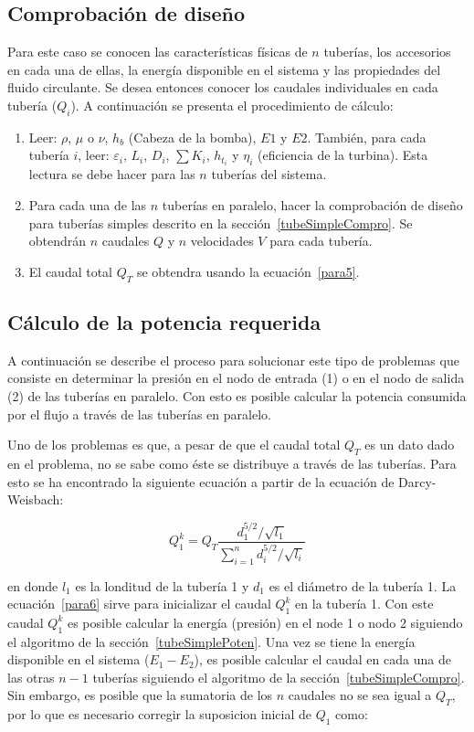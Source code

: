 \documentclass[10pt, oneside]{article}
\begin{document}
\subsection{Comprobaci\'on de dise\~no} 
Para este caso se conocen las caracter\'isticas f\'isicas de $n$ tuber\'ias, los accesorios en cada una de ellas, la energ\'ia disponible en el sistema y las propiedades del fluido circulante. Se desea entonces conocer los caudales individuales en cada tuber\'ia ($Q_i$). A continuaci\'on se presenta el procedimiento de c\'alculo: 
\begin{enumerate}
\item Leer: $\rho$, $\mu$ o $\nu$, $h_{b}$ (Cabeza de la bomba), $E1$ y $E2$. Tambi\'en, para cada tuber\'ia $i$, leer: $\varepsilon_i$, $L_i$, $D_i$, $\sum K_i$, $h_{t_i}$ y $\eta_i$ (eficiencia de la turbina). Esta lectura se debe hacer para las $n$ tuber\'ias del sistema.
\item Para cada una de las $n$ tuber\'ias en paralelo, hacer la comprobaci\'on de dise\~no para tuber\'ias simples descrito en la secci\'on~\ref{tubeSimpleCompro}. Se obtendr\'an $n$ caudales $Q$ y $n$ velocidades $V$ para cada tuber\'ia. 
\item El caudal total $Q_T$ se obtendra usando la ecuaci\'on~\ref{para5}. 
\end{enumerate}

\subsection{C\'alculo de la potencia requerida}\label{tubeParallPoten}
A continuaci\'on se describe el proceso para solucionar este tipo de problemas que consiste en determinar la presi\'on en el nodo de entrada (1) o en el nodo de salida (2) de las tuber\'ias en paralelo. Con esto es posible calcular la potencia consumida por el flujo a trav\'es de las tuber\'ias en paralelo. 

Uno de los problemas es que, a pesar de que el caudal total $Q_T$ es un dato dado en el problema, no se sabe como \'este se distribuye a trav\'es de las tuber\'ias. Para esto se ha encontrado la siguiente ecuaci\'on a partir de la ecuaci\'on de Darcy-Weisbach:

\begin{equation}
Q_1^k = Q_T \frac{d_1^{5/2} / \sqrt{l_1}}{\sum_{i=1}^n d_i^{5/2} / \sqrt{l_i}}
\label{para6}
\end{equation}

en donde $l_1$ es la londitud de la tuber\'ia 1 y $d_1$ es el di\'ametro de la tuber\'ia 1. La ecuaci\'on~\ref{para6} sirve para inicializar el caudal $Q_1^k$ en la tuber\'ia 1. Con este caudal $Q_1^k$ es posible calcular la energ\'ia (presi\'on) en el node 1 o nodo 2 siguiendo el algoritmo de la secci\'on~\ref{tubeSimplePoten}. Una vez se tiene la energ\'ia disponible en el sistema ($E_1-E_2$), es posible calcular el caudal en cada una de las otras $n-1$ tuber\'ias siguiendo el algoritmo de la secci\'on~\ref{tubeSimpleCompro}. Sin embargo, es posible que la sumatoria de los $n$ caudales no se sea igual a $Q_T$, por lo que es necesario corregir la suposicion inicial de $Q_1$ como:
\end{document}

